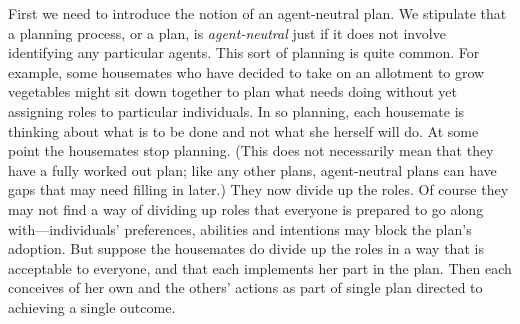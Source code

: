 \documentclass[12pt,\papersize]{extarticle}
\begin{document}

First we need to introduce the notion of an agent-neutral plan.
We stipulate that a planning process, or a plan, is \emph{agent-neutral} just if it does not involve identifying any particular agents.  
This sort of planning is quite common.
For example, some housemates who have decided to take on an allotment to grow vegetables might sit down together to plan what needs doing without yet assigning roles to particular individuals. 
In so planning, each housemate is thinking about what is to be done and not what she herself will do.  
At some point the housemates stop planning.
(This does not necessarily mean that they have a fully worked out plan; like any other plans, agent-neutral plans can have gaps that may need filling in later.)
They now divide up the roles.
Of course they may not find a way of dividing up roles that everyone is prepared to go along with---individuals' preferences, abilities and intentions may block the plan's adoption.
But suppose the housemates do divide up the roles in a way that is acceptable to everyone, 
	and that each implements her part in the plan.
Then each conceives of her own and the others' actions as part of single plan directed to achieving a single outcome.
\end{document}
